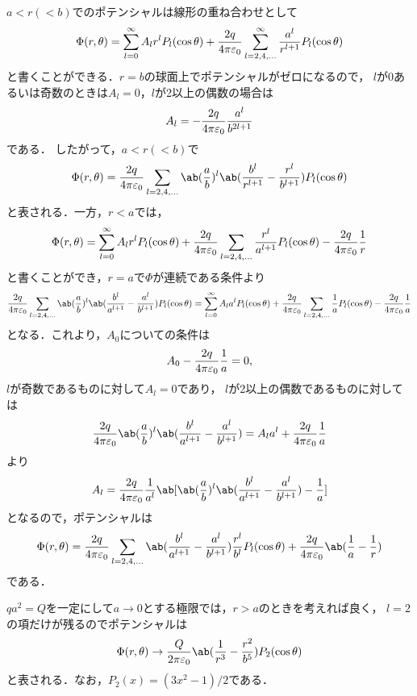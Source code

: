   $a < r ( < b)$でのポテンシャルは線形の重ね合わせとして
  \begin{gather}%
    \Phi(r, \theta) = \sum_{l=0}^\infty A_l r^l P_l(\cos\theta) + \frac{2q}{4\pi \eps_0} \sum_{l = 2, 4, \ldots}^\infty \frac{a^l}{r^{l+1}}P_l(\cos\theta)
  \end{gather}%
  と書くことができる．$r = b$の球面上でポテンシャルがゼロになるので，
  $l$が$0$あるいは奇数のときは$A_l = 0$，$l$が2以上の偶数の場合は
  \begin{gather}%
    A_l = -\frac{2q}{4\pi\eps_0} \frac{a^l}{b^{2l+1}}
  \end{gather}%
  である．
  したがって，$a < r (< b)$で
  \begin{gather}%
    \Phi(r, \theta) = \frac{2q}{4\pi\eps_0} \sum_{l = 2, 4, \ldots} \ab(\frac ab)^l \ab(
    \frac{b^l}{r^{l+1}} - \frac{r^l}{b^{l+1}}) P_l(\cos\theta)
  \end{gather}%
  と表される．一方，$r < a$では，
  \begin{gather}%
    \Phi(r, \theta) = \sum_{l=0}^\infty A_l r^l P_l(\cos\theta) + \frac{2q}{4\pi\eps_0} \sum_{l=2, 4, \ldots}\frac{r^l}{a^{l+1}} P_l(\cos\theta) - \frac{2q}{4\pi\eps_0} \frac{1}{r}
  \end{gather}%
  と書くことができ，$r = a$で$\Phi$が連続である条件より
  \begin{gather}%
    \frac{2q}{4\pi\eps_0} \sum_{l=2, 4, \ldots}\ab(\frac ab)^l\ab(\frac{b^l}{a^{l+1}} - \frac{a^l}{b^{l+1}}) P_l(\cos\theta)= \sum_{l=0}^\infty A_l a^l P_l(\cos\theta) + \frac{2q}{4\pi\eps_0} \sum_{l=2, 4, \ldots} \frac{1}{a} P_l(\cos\theta) - \frac{2q}{4\pi\eps_0}\frac{1}{a}
  \end{gather}%
  となる．これより，$A_0$についての条件は
  \begin{gather}%
    A_0 - \frac{2q}{4\pi\eps_0} \frac{1}{a} = 0,
  \end{gather}%
  $l$が奇数であるものに対して$A_l = 0$であり，
  $l$が2以上の偶数であるものに対しては
  \begin{gather}%
    \frac{2q}{4\pi\eps_0} \ab(\frac ab)^l\ab(\frac{b^l}{a^{l+1}} - \frac{a^l}{b^{l+1}}) = A_l a^l + \frac{2q}{4\pi\eps_0} \frac{1}{a}
  \end{gather}%
  より
  \begin{gather}%
    A_l = \frac{2q}{4\pi\eps_0}\frac{1}{a^l} \ab[\ab(\frac ab)^l\ab(\frac{b^l}{a^{l+1}} - \frac{a^l}{b^{l+1}}) - \frac 1a] 
  \end{gather}%
  となるので，ポテンシャルは
  \begin{gather}%
    \Phi(r, \theta) = \frac{2q}{4\pi\eps_0} \sum_{l = 2, 4, \ldots}  \ab(\frac{b^l}{a^{l+1}} - \frac{a^l}{b^{l+1}})\frac{r^l}{b^l} P_l(\cos\theta) + \frac{2q}{4\pi\eps_0} \ab(\frac 1a - \frac 1r)
  \end{gather}%
  である．

 $qa^2 = Q$を一定にして$a \to 0$とする極限では，$r > a$のときを考えれば良く，
 $l = 2$の項だけが残るのでポテンシャルは
  \begin{gather}%
    \Phi(r ,\theta) \to \frac{Q}{2\pi\eps_0} \ab(\frac{1}{r^3} - \frac{r^2}{b^5}) P_2(\cos\theta)
  \end{gather}%
  と表される．なお，$P_2(x) = (3x^2 - 1)/2$である．

\clearpage
